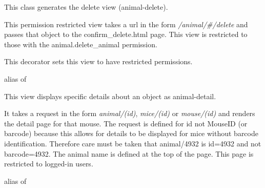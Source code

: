 \documentclass[letterpaper,10pt,english]{sphinxmanual}
\begin{document}

\begin{fulllineitems}
\label{animals:mousedb.animal.views.AnimalDelete}
This class generates the delete {\hyperref[animals:mousedb.animal.models.Animal]{}} view (animal-delete).

This permission restricted view takes a url in the form \emph{/animal/\#/delete} and passes that object to the confirm\_delete.html page.
This view is restricted to those with the animal.delete\_animal permission.

\begin{fulllineitems}
\label{animals:mousedb.animal.views.AnimalDelete.dispatch}
This decorator sets this view to have restricted permissions.

\end{fulllineitems}


\begin{fulllineitems}
\label{animals:mousedb.animal.views.AnimalDelete.model}
alias of 

\end{fulllineitems}


\end{fulllineitems}


\begin{fulllineitems}
\label{animals:mousedb.animal.views.AnimalDetail}
This view displays specific details about an {\hyperref[animals:mousedb.animal.models.Animal]{}} object as animal-detail.

It takes a request in the form \emph{animal/(id)}, \emph{mice/(id)} or \emph{mouse/(id)} and renders the detail page for that mouse.  The request is defined for id not MouseID (or barcode) because this allows for details to be displayed for mice without barcode identification.
Therefore care must be taken that animal/4932 is id=4932 and not barcode=4932.  The animal name is defined at the top of the page.
This page is restricted to logged-in users.

\begin{fulllineitems}
\label{animals:mousedb.animal.views.AnimalDetail.model}
alias of 

\end{fulllineitems}


\end{fulllineitems}
\end{document}
